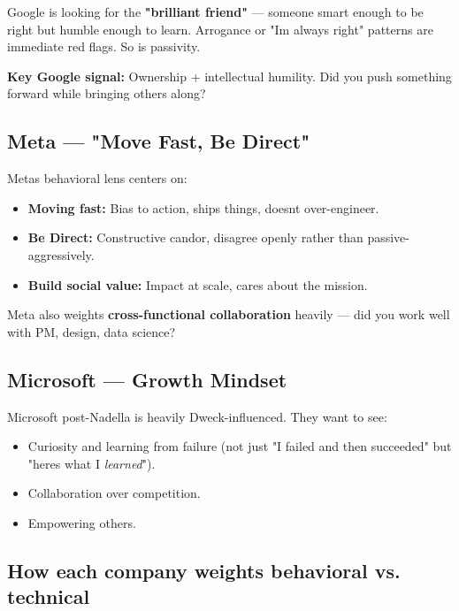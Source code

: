 \documentclass[11pt]{article}
\providecommand{\tightlist}{\setlength{\itemsep}{1pt}\setlength{\parskip}{0pt}}
\begin{document}
Google is looking for the \textbf{"brilliant friend"} --- someone smart enough to be right but humble enough to learn. Arrogance or "I\textquotesingle m always right" patterns are immediate red flags. So is passivity.

\textbf{Key Google signal:} Ownership + intellectual humility. Did you push something forward while bringing others along?

\subsection{Meta --- "Move Fast, Be Direct"}\label{meta--move-fast-be-direct}

Meta\textquotesingle s behavioral lens centers on:

\begin{itemize}
\tightlist
\item
  \textbf{Moving fast:} Bias to action, ships things, doesn\textquotesingle t over-engineer.
\item
  \textbf{Be Direct:} Constructive candor, disagree openly rather than passive-aggressively.
\item
  \textbf{Build social value:} Impact at scale, cares about the mission.
\end{itemize}

Meta also weights \textbf{cross-functional collaboration} heavily --- did you work well with PM, design, data science?

\subsection{Microsoft --- Growth Mindset}\label{microsoft--growth-mindset}

Microsoft post-Nadella is heavily Dweck-influenced. They want to see:

\begin{itemize}
\tightlist
\item
  Curiosity and learning from failure (not just "I failed and then succeeded" but "here\textquotesingle s what I \emph{learned}").
\item
  Collaboration over competition.
\item
  Empowering others.
\end{itemize}

\subsection{How each company weights behavioral vs. technical}\label{how-each-company-weights-behavioral-vs-technical}
\end{document}
